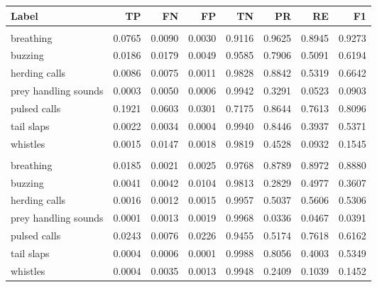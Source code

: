 
\begin{tabular}[t]{lrrrrrrr}
\toprule
Label & TP & FN & FP & TN & PR & RE & F1\\
\midrule
\addlinespace[0.3em]
\multicolumn{8}{l}{\textbf{select}}\\
\hspace{1em}breathing & 0.0765 & 0.0090 & 0.0030 & 0.9116 & 0.9625 & 0.8945 & 0.9273\\
\hspace{1em}buzzing & 0.0186 & 0.0179 & 0.0049 & 0.9585 & 0.7906 & 0.5091 & 0.6194\\
\hspace{1em}herding calls & 0.0086 & 0.0075 & 0.0011 & 0.9828 & 0.8842 & 0.5319 & 0.6642\\
\hspace{1em}prey handling sounds & 0.0003 & 0.0050 & 0.0006 & 0.9942 & 0.3291 & 0.0523 & 0.0903\\
\hspace{1em}pulsed calls & 0.1921 & 0.0603 & 0.0301 & 0.7175 & 0.8644 & 0.7613 & 0.8096\\
\hspace{1em}tail slaps & 0.0022 & 0.0034 & 0.0004 & 0.9940 & 0.8446 & 0.3937 & 0.5371\\
\hspace{1em}whistles & 0.0015 & 0.0147 & 0.0018 & 0.9819 & 0.4528 & 0.0932 & 0.1545\\
\addlinespace[0.3em]
\multicolumn{8}{l}{\textbf{all}}\\
\hspace{1em}breathing & 0.0185 & 0.0021 & 0.0025 & 0.9768 & 0.8789 & 0.8972 & 0.8880\\
\hspace{1em}buzzing & 0.0041 & 0.0042 & 0.0104 & 0.9813 & 0.2829 & 0.4977 & 0.3607\\
\hspace{1em}herding calls & 0.0016 & 0.0012 & 0.0015 & 0.9957 & 0.5037 & 0.5606 & 0.5306\\
\hspace{1em}prey handling sounds & 0.0001 & 0.0013 & 0.0019 & 0.9968 & 0.0336 & 0.0467 & 0.0391\\
\hspace{1em}pulsed calls & 0.0243 & 0.0076 & 0.0226 & 0.9455 & 0.5174 & 0.7618 & 0.6162\\
\hspace{1em}tail slaps & 0.0004 & 0.0006 & 0.0001 & 0.9988 & 0.8056 & 0.4003 & 0.5349\\
\hspace{1em}whistles & 0.0004 & 0.0035 & 0.0013 & 0.9948 & 0.2409 & 0.1039 & 0.1452\\
\bottomrule
\end{tabular}
